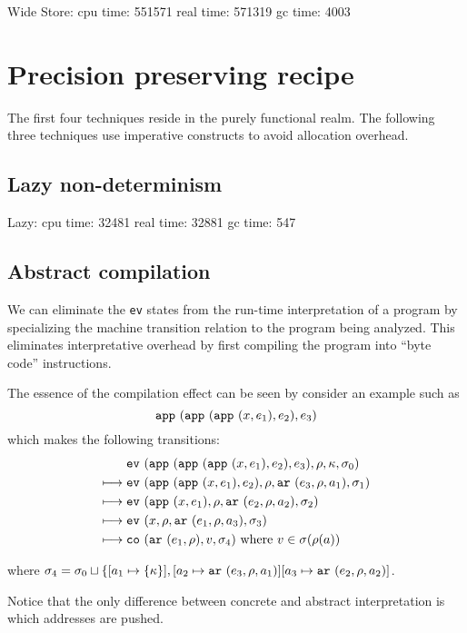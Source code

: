 \documentclass[preprint]{sigplanconf}
\begin{document}
Wide Store: cpu time: 551571 real time: 571319 gc time: 4003

\section{Precision preserving recipe}

The first four techniques reside in the purely functional realm. The
following three techniques use imperative constructs to avoid allocation
overhead.

\subsection{Lazy non-determinism}

Lazy:
   cpu time: 32481 real time: 32881 gc time: 547

\subsection{Abstract compilation}

We can eliminate the {\tt ev} states from the run-time interpretation
of a program by specializing the machine transition relation to the
program being analyzed.  This eliminates interpretative overhead by
first compiling the program into ``byte code'' instructions.

The essence of the compilation effect can be seen by consider an example
such as
\[
{\tt app{\ }}({{\tt app{\ }}({{\tt app{\ }}({x,e_1}),e_2}),e_3})
\]
which makes the following transitions:
\begin{align}
& \ev{\sapp{\sapp{\sapp\mvar{\mexp_1}}{\mexp_2}}{\mexp_3},\menv,\mkont,\msto_0}\\
\machstep\; &
\ev{\sapp{\sapp\mvar{\mexp_1}}{\mexp_2},\menv,\kar{\mexp_3,\menv,\maddr_1},\msto_1}
\\
\machstep\; &
\ev{\sapp\mvar{\mexp_1},\menv,\kar{\mexp_2,\menv,\maddr_2},\msto_2}
\\
\machstep\; &
\ev{\mvar, \menv,\kar{\mexp_1,\menv,\maddr_3},\msto_3} %
\\
\machstep\; &
\co{\kar{\mexp_1,\menv},\mval,\msto_4} %
\mbox{ where } \mval \in \msto(\menv(\maddr))
\end{align}

where $\sigma_4 = \sigma_0 \sqcup \{ [a_1 \mapsto \{ \kappa \}],
[a_2 \mapsto {\tt ar{\ }}({e_3,\rho,a_1})]
[a_3 \mapsto {\tt ar{\ }}({e_2,\rho,a_2})]$.


Notice that the only difference between concrete and abstract interpretation
is which addresses are pushed.
\end{document}
